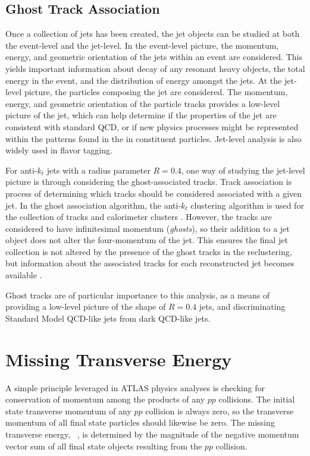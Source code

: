\subsection{Ghost Track Association}
\label{sec:ghost}
Once a collection of jets has been created, the jet objects can be studied at both the event-level and the jet-level. In the event-level picture, the momentum, energy, and geometric orientation of the jets within an event are considered. This yields important information about decay of any resonant heavy objects, the total energy in the event, and the distribution of energy amongst the jets. At the jet-level picture, the particles composing the jet are considered. The momentum, energy, and geometric orientation of the particle tracks provides a low-level picture of the jet, which can help determine if the properties of the jet are consistent with standard QCD, or if new physics processes might be represented within the patterns found in the in constituent particles. Jet-level analysis is also widely used in flavor tagging. \par

For anti-$k_t$ jets with a radius parameter $R=0.4$, one way of studying the jet-level picture is through considering the ghost-associated tracks. Track association is process of determining which tracks should be considered associated with a given jet. In the ghost association algorithm, the anti-$k_t$ clustering algorithm is used for the collection of tracks and calorimeter clusters \cite{ghosts2}. However, the tracks are considered to have infinitesimal momentum (\textit{ghosts}), so their addition to a jet object does not alter the four-momentum of the jet. This ensures the final jet collection is not altered by the presence of the ghost tracks in the reclustering, but information about the associated tracks for each reconstructed jet becomes available \cite{ghosts1}. \par

Ghost tracks are of particular importance to this analysis, as a means of providing a low-level picture of the shape of $R=0.4$ jets, and discriminating Standard Model QCD-like jets from dark QCD-like jets. 

\section{Missing Transverse Energy}
A simple principle leveraged in ATLAS physics analyses is checking for conservation of momentum among the products of any $pp$ collisions. The initial state transverse momentum of any $pp$ collision is always zero, so the transverse momentum of all final state particles should likewise be zero. The missing transverse energy, \met~, is determined by the magnitude of the negative momentum vector sum of all final state objects resulting from the $pp$ collision. \par


